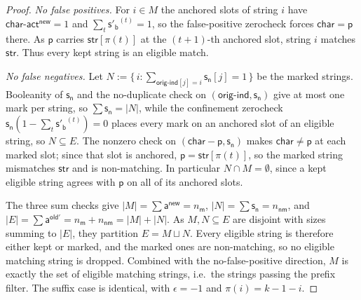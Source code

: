 \begin{proof}
\emph{No false positives.} For $i\in M$ the anchored slots of string $i$ have $\mathsf{char\text{-}act^{new}}=1$ and $\sum_t \mathsf{s'_b}^{(t)}=1$, so the false-positive zerocheck forces $\mathsf{char}=\mathsf{p}$ there. As $\mathsf{p}$ carries $\mathsf{str}[\pi(t)]$ at the $(t{+}1)$-th anchored slot, string $i$ matches $\mathsf{str}$. Thus every kept string is an eligible match.

\emph{No false negatives.} Let $N := \{\,i : \sum_{\mathsf{orig\text{-}ind}[j]=i}\mathsf{s_n}[j]=1\,\}$ be the marked strings. Booleanity of $\mathsf{s_n}$ and the no-duplicate check on $(\mathsf{orig\text{-}ind},\mathsf{s_n})$ give at most one mark per string, so $\sum\mathsf{s_n}=|N|$, while the confinement zerocheck $\mathsf{s_n}(1-\sum_t\mathsf{s'_b}^{(t)})=0$ places every mark on an anchored slot of an eligible string, so $N\subseteq E$. The nonzero check on $(\mathsf{char}-\mathsf{p},\mathsf{s_n})$ makes $\mathsf{char}\neq\mathsf{p}$ at each marked slot; since that slot is anchored, $\mathsf{p}=\mathsf{str}[\pi(t)]$, so the marked string mismatches $\mathsf{str}$ and is non-matching. In particular $N\cap M=\emptyset$, since a kept eligible string agrees with $\mathsf{p}$ on all of its anchored slots.

The three sum checks give $|M|=\sum\mathsf{a^{new}}=n_{\mathsf{m}}$, $|N|=\sum\mathsf{s_n}=n_{\mathsf{nm}}$, and $|E|=\sum\mathsf{a^{old'}}=n_{\mathsf{m}}+n_{\mathsf{nm}}=|M|+|N|$. As $M,N\subseteq E$ are disjoint with sizes summing to $|E|$, they partition $E=M\sqcup N$. Every eligible string is therefore either kept or marked, and the marked ones are non-matching, so no eligible matching string is dropped. Combined with the no-false-positive direction, $M$ is exactly the set of eligible matching strings, i.e.\ the strings passing the prefix filter. The suffix case is identical, with $\epsilon=-1$ and $\pi(i)=k-1-i$.
\end{proof}

